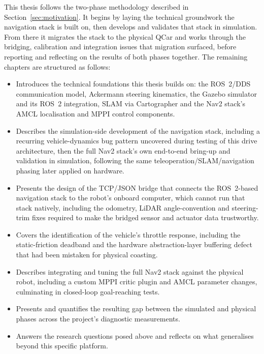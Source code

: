 This thesis follows the two-phase methodology described in
Section~\ref{sec:motivation}. It begins by laying the technical
groundwork the navigation stack is built on, then develops and
validates that stack in simulation. From there it migrates the stack
to the physical QCar and works through the bridging, calibration and
integration issues that migration surfaced, before reporting and
reflecting on the results of both phases together. The remaining
chapters are structured as follows:

\begin{itemize}
  \item Introduces the technical foundations this thesis builds on:
        the ROS~2/DDS communication model, Ackermann steering
        kinematics, the Gazebo simulator and its ROS~2 integration,
        SLAM via Cartographer and the Nav2 stack's AMCL localisation
        and MPPI control components.
  \item Describes the simulation-side development of the navigation
        stack, including a recurring vehicle-dynamics bug pattern
        uncovered during testing of this drive architecture, then
        the full Nav2 stack's own end-to-end bring-up and validation
        in simulation, following the same teleoperation/SLAM/navigation
        phasing later applied on hardware.
  \item Presents the design of the TCP/JSON bridge that connects the
        ROS~2-based navigation stack to the robot's onboard computer,
        which cannot run that stack natively, including the odometry,
        LiDAR angle-convention and steering-trim fixes required to
        make the bridged sensor and actuator data trustworthy.
  \item Covers the identification of the vehicle's throttle response,
        including the static-friction deadband and the hardware
        abstraction-layer buffering defect that had been mistaken for
        physical coasting.
  \item Describes integrating and tuning the full Nav2 stack against
        the physical robot, including a custom MPPI critic plugin and
        AMCL parameter changes, culminating in closed-loop
        goal-reaching tests.
  \item Presents and quantifies the resulting gap between the
        simulated and physical phases across the project's diagnostic
        measurements.
  \item Answers the research questions posed above and reflects on
        what generalises beyond this specific platform.
\end{itemize}
